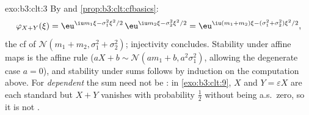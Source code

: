 \begin{solution}{exo:b3:clt:3}
By  and \cref{prop:b3:clt:cfbasics}:
\[
\varphi_{X+Y}(\xi) = \eu^{\iu m_1\xi - \sigma_1^2\xi^2/2}\,
\eu^{\iu m_2\xi - \sigma_2^2\xi^2/2}
= \eu^{\iu(m_1+m_2)\xi - (\sigma_1^2+\sigma_2^2)\xi^2/2},
\]
the cf of $\mathcal N(m_1 + m_2, \sigma_1^2 + \sigma_2^2)$;
injectivity concludes. Stability under affine maps is the
affine rule ($aX + b \sim \mathcal N(am_1 + b,
a^2\sigma_1^2)$, allowing the degenerate case $a = 0$), and
stability under  sums follows by induction on the
computation above. For \emph{dependent}  the sum
need not be : in \cref{exo:b3:clt:9}, $X$ and $Y =
\varepsilon X$ are each standard  but $X + Y$
vanishes with probability $\frac12$ without being a.s.\
zero, so it is not .
\end{solution}

